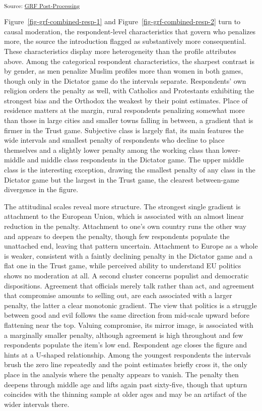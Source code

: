 \documentclass[
  10pt,
  a4paper,
  DIV=11,
  numbers=noendperiod]{scrartcl}
\begin{document}
\textsubscript{Source:
\href{https://dertristan.github.io/MBEU25/code/07_postprocess_grf-preview.html\#cell-fig-grf-combined-prof}{GRF
Post-Processing}}

Figure~\ref{fig-grf-combined-resp-1} and
Figure~\ref{fig-grf-combined-resp-2} turn to causal moderation, the
respondent-level characteristics that govern who penalizes more, the
source the introduction flagged as substantively more consequential.
These characteristics display more heterogeneity than the profile
attributes above. Among the categorical respondent characteristics, the
sharpest contrast is by gender, as men penalize Muslim profiles more
than women in both games, though only in the Dictator game do the
intervals separate. Respondents' own religion orders the penalty as
well, with Catholics and Protestants exhibiting the strongest bias and
the Orthodox the weakest by their point estimates. Place of residence
matters at the margin, rural respondents penalizing somewhat more than
those in large cities and smaller towns falling in between, a gradient
that is firmer in the Trust game. Subjective class is largely flat, its
main features the wide intervals and smallest penalty of respondents who
decline to place themselves and a slightly lower penalty among the
working class than lower-middle and middle class respondents in the
Dictator game. The upper middle class is the interesting exception,
drawing the smallest penalty of any class in the Dictator game but the
largest in the Trust game, the clearest between-game divergence in the
figure.

The attitudinal scales reveal more structure. The strongest single
gradient is attachment to the European Union, which is associated with
an almost linear reduction in the penalty. Attachment to one's own
country runs the other way and appears to deepen the penalty, though few
respondents populate the unattached end, leaving that pattern uncertain.
Attachment to Europe as a whole is weaker, consistent with a faintly
declining penalty in the Dictator game and a flat one in the Trust game,
while perceived ability to understand EU politics shows no moderation at
all. A second cluster concerns populist and democratic dispositions.
Agreement that officials merely talk rather than act, and agreement that
compromise amounts to selling out, are each associated with a larger
penalty, the latter a clear monotonic gradient. The view that politics
is a struggle between good and evil follows the same direction from
mid-scale upward before flattening near the top. Valuing compromise, its
mirror image, is associated with a marginally smaller penalty, although
agreement is high throughout and few respondents populate the item's low
end. Respondent age closes the figure and hints at a U-shaped
relationship. Among the youngest respondents the intervals brush the
zero line repeatedly and the point estimates briefly cross it, the only
place in the analysis where the penalty appears to vanish. The penalty
then deepens through middle age and lifts again past sixty-five, though
that upturn coincides with the thinning sample at older ages and may be
an artifact of the wider intervals there.
\end{document}
